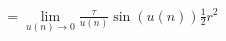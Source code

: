 \documentclass[preview]{standalone}
\begin{document}
\begin{align*}
= \lim_{u(n) \to 0} \frac {\tau} {u(n)} \sin \left( u(n) \right) \frac {1} {2} r^2
\end{align*}
\end{document}
